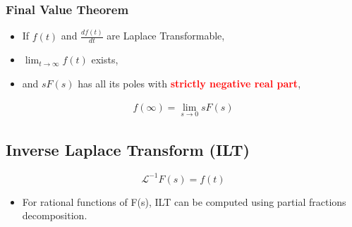 \documentclass[a4paper]{article}
\begin{document}
\subsubsection{Final Value Theorem}
\begin{itemize}
    \item If $f(t)$ and $\frac{df(t)}{dt}$ are Laplace Transformable,
    \item $\displaystyle\lim_{t\rightarrow\infty} f(t)$ exists,
    \item and $sF(s)$ has all its poles with \textcolor{red}{\textbf{strictly negative real part}},
\end{itemize}
\begin{align*}
    f(\infty) = \lim_{s\rightarrow0} sF(s)
\end{align*}
\newpage
\subsection{Inverse Laplace Transform (ILT)}
$$\mathscr{L}^{-1}F(s) = f(t)$$
\begin{itemize}
    \item For rational functions of F(s), ILT can be computed using partial fractions decomposition.
\end{itemize}
\end{document}

